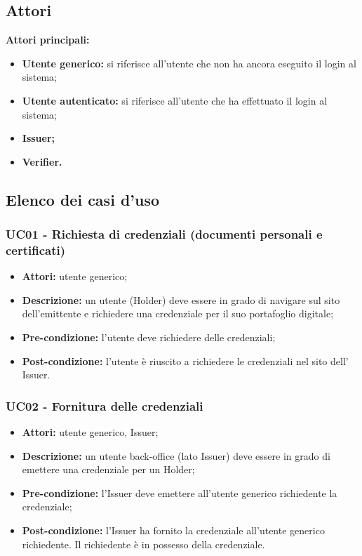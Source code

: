 \subsection{Attori}
\textbf{Attori principali:}
\begin{itemize}
    \item\textbf{Utente generico:} si riferisce all’utente che non ha ancora eseguito il login al sistema;
    \item\textbf{Utente autenticato:} si riferisce all’utente che ha effettuato il login al sistema;
    \item\textbf{Issuer;}
    \item\textbf{Verifier.}
\end{itemize}


\subsection{Elenco dei casi d'uso}
\subsubsection{UC01 - Richiesta di credenziali (documenti personali e certificati)}
\begin{itemize}
\item \textbf{Attori:} utente generico;
\item \textbf{Descrizione:} un utente (Holder) deve essere in grado di navigare sul sito dell'emittente e richiedere una credenziale per il suo portafoglio digitale;
\item \textbf{Pre-condizione:} l’utente deve richiedere delle credenziali;
\item \textbf{Post-condizione:} l’utente è riuscito a richiedere le credenziali nel sito dell’ Issuer.
\end{itemize}

\subsubsection{UC02 - Fornitura delle credenziali}
\begin{itemize}
\item \textbf{Attori:} utente generico, Issuer;
\item \textbf{Descrizione:} un utente back-office (lato Issuer) deve essere in grado di emettere una credenziale per un Holder;
\item \textbf{Pre-condizione:} l’Issuer deve emettere all’utente generico richiedente la credenziale;
\item \textbf{Post-condizione:} l’Issuer ha fornito la credenziale all'utente generico richiedente. Il richiedente è in possesso della credenziale.
\end{itemize}

